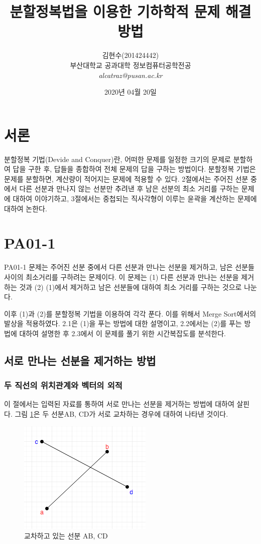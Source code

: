 \documentclass[10pt,a4paper]{article}
\title{\textbf{분할정복법을 이용한 기하학적 문제 해결 방법}}
\author{김현수(201424442)\\[3mm]부산대학교 공과대학 정보컴퓨터공학전공\\[3mm]\textit{alcatraz@pusan.ac.kr}}
\date{2020년 04월 20일}
\begin{document}
\maketitle
\tableofcontents
\begin{spacing}{1.6}
\section{서론}
  분할정복 기법(Devide and Conquer)란, 어떠한 문제를 일정한 크기의 문제로 분할하여 답을 구한 후, 답들을 종합하여 전체 문제의 답을 구하는 방법이다. 분할정복 기법은 문제를 분할하면, 계산량이 적어지는 문제에 적용할 수 있다. 2절에서는 주어진 선분 중에서 다른 선분과 만나지 않는 선분만 추려낸 후 남은 선분의 최소 거리를 구하는 문제에 대하여 이야기하고, 3절에서는 중첩되는 직사각형이 이루는 윤곽을 계산하는 문제에 대하여 논한다.
  
\section{PA01-1}
  PA01-1 문제는 주어진 선분 중에서 다른 선분과 만나는 선분을 제거하고, 남은 선분들 사이의 최소거리를 구하려는 문제이다. 이 문제는 (1) 다른 선분과 만나는 선분을 제거하는 것과 (2) (1)에서 제거하고 남은 선분들에 대하여 최소 거리를 구하는 것으로 나눈다. 
  
  이후 (1)과 (2)를 분할정복 기법을 이용하여 각각 푼다. 이를 위해서 Merge Sort에서의 발상을 적용하였다. 2.1은 (1)을 푸는 방법에 대한 설명이고, 2.2에서는 (2)를 푸는 방법에 대하여 설명한 후 2.3에서 이 문제를 풀기 위한 시간복잡도를 분석한다. 
  
\subsection{서로 만나는 선분을 제거하는 방법}
\subsubsection{두 직선의 위치관계와 벡터의 외적}
  이 절에서는 입력된 자료를 통하여 서로 만나는 선분을 제거하는 방법에 대하여 살핀다. 그림 \ref{fig1}은 두 선분AB, CD가 서로 교차하는 경우에 대하여 나타낸 것이다. 
  \begin{figure}
  	\centering
  	\includegraphics[scale=1]{Fig1.png}
  	\caption{교차하고 있는 선분 AB, CD}
  	\label{fig1}
  \end{figure}


\end{spacing}
\end{document}

